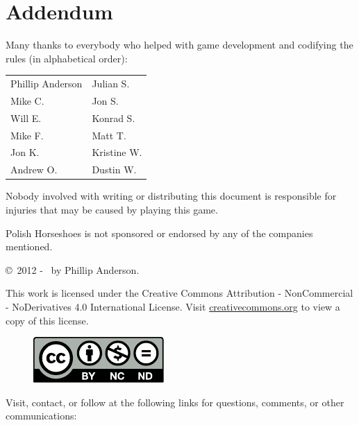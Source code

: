 \part*{Addendum}


Many thanks to everybody who helped with game development and codifying the rules (in alphabetical order):\medskip{}

\begin{tabular}{>{\raggedright}p{3.5cm}>{\raggedright}p{2.5cm}}
	Phillip Anderson & Julian S.\tabularnewline
	Mike C. & Jon S.\tabularnewline
	Will E. & Konrad S.\tabularnewline
	Mike F. & Matt T.\tabularnewline
	Jon K. & Kristine W.\tabularnewline
	Andrew O. & Dustin W.\tabularnewline
\end{tabular}


Nobody involved with writing or distributing this document is responsible for injuries that may be caused by playing this game.

\medskip{}\noindent Polish Horseshoes is not sponsored or endorsed by any of the companies mentioned.


\copyright\ 2012 - \the\year\ by Phillip Anderson. 

\noindent This work is licensed under the Creative Commons Attribution
- NonCommercial - NoDerivatives 4.0 International License. 
Visit \href{http://creativecommons.org/licenses/by-nc-nd/4.0/}{creativecommons.org} to view a copy of this license.

\begin{figure}[!ht]
	\includegraphics[width=\columnwidth]{images/by-nc-nd}
\end{figure}

\newpage{}

\noindent Visit, contact, or follow at the following links for questions, comments, or other communications:

